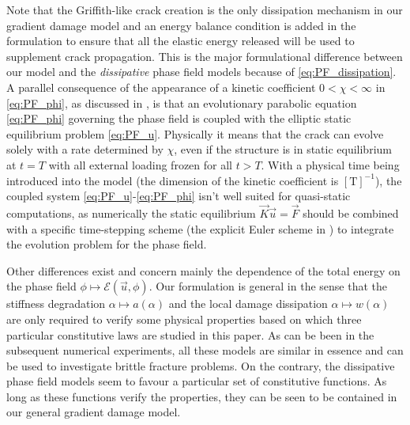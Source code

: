 Note that the Griffith-like crack creation is the only dissipation mechanism in our gradient damage model and an energy balance condition is added in the formulation to ensure that all the elastic energy released will be used to supplement crack propagation. This is the major formulational difference between our model and the \emph{dissipative} phase field models because of \eqref{eq:PF_dissipation}. A parallel consequence of the appearance of a kinetic coefficient $0<\chi<\infty$ in \eqref{eq:PF_phi}, as discussed in \cite{Bourdin:2011}, is that an evolutionary parabolic equation \eqref{eq:PF_phi} governing the phase field is coupled with the elliptic static equilibrium problem \eqref{eq:PF_u}. Physically it means that the crack can evolve solely with a rate determined by $\chi$, even if the structure is in static equilibrium at $t=T$ with all external loading frozen for all $t>T$. With a physical time being introduced into the model (the dimension of the kinetic coefficient is $[\mathrm{T}]^{-1}$), the coupled system \eqref{eq:PF_u}-\eqref{eq:PF_phi} isn't well suited for quasi-static computations, as numerically the static equilibrium  $\vec{K}\vec{u}=\vec{F}$ should be combined with a specific time-stepping scheme (the explicit Euler scheme in \cite{HakimKarma:2009}) to integrate the evolution problem for the phase field.

Other differences exist and concern mainly the dependence of the total energy on the phase field $\phi\mapsto\mathcal{E}(\vec{u},\phi)$. Our formulation is general in the sense that the stiffness degradation $\alpha\mapsto a(\alpha)$ and the local damage dissipation $\alpha\mapsto w(\alpha)$ are only required to verify some physical properties based on which three particular constitutive laws are studied in this paper. As can be been in the subsequent numerical experiments, all these models are similar in essence and can be used to investigate brittle fracture problems. On the contrary, the dissipative phase field models \cite{KarmaKesslerLevine:2001,HakimKarma:2009} seem to favour a particular set of constitutive functions. As long as these functions verify the properties, they can be seen to be contained in our general gradient damage model.


